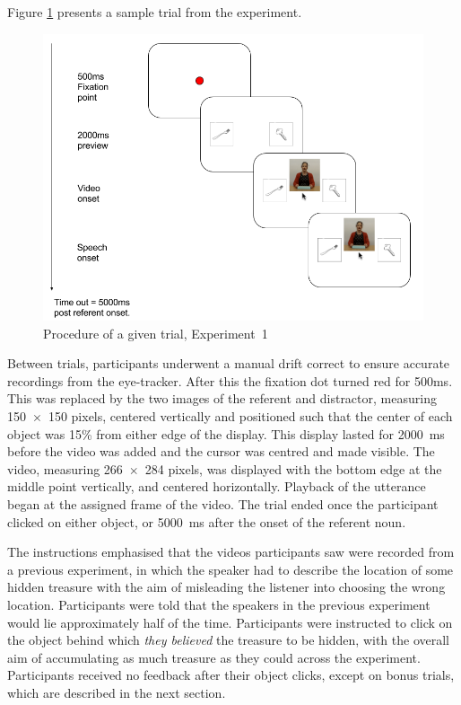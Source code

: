 \documentclass[a4paper,man,natbib]{apa6}
\begin{document}
Figure \ref{fig:v1_trial} presents a sample trial from the experiment. 
\begin{figure}[Ht]
  \centering
	\includegraphics[width=\linewidth]{./img/e7_trial.png}
  \caption{Procedure of a given trial, Experiment~1}
  \label{fig:v1_trial}
\end{figure}
Between trials, participants underwent a manual drift correct to ensure accurate recordings from the eye-tracker.
After this the fixation dot turned red for 500ms. 
This was replaced by the two images of the referent and distractor, measuring 150~$\times$~150 pixels, centered vertically and positioned such that the center of each object was 15\% from either edge of the display. 
This display lasted for 2000~ms before the video was added and the cursor was centred and made visible.
The video, measuring 266~$\times$~284 pixels, was displayed with the bottom edge at the middle point vertically, and centered horizontally.
Playback of the utterance began at the assigned frame of the video.
The trial ended once the participant clicked on either object, or 5000~ms after the onset of the referent noun.

The instructions emphasised that the videos participants saw were recorded from a previous experiment, in which the speaker had to describe the location of some hidden treasure with the aim of misleading the listener into choosing the wrong location.
Participants were told that the speakers in the previous experiment would lie approximately half of the time. 
Participants were instructed to click on the object behind which \textit{they believed} the treasure to be hidden, with the overall aim of accumulating as much treasure as they could across the experiment.
Participants received no feedback after their object clicks, except on bonus trials, which are described in the next section.
\end{document}

